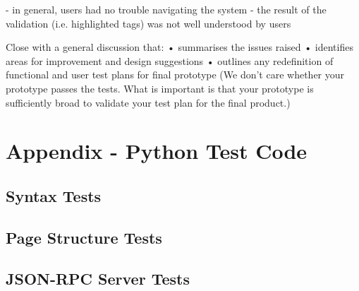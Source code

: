 \documentclass[10pt]{article}
\begin{document}
- in general, users had no trouble navigating the system
- the result of the validation (i.e. highlighted tags) was not well understood by users

Close with a general discussion that: 
• summarises the issues raised 
• identifies areas for improvement and design suggestions 
• outlines any redefinition of functional and user test plans for final 
prototype 
(We don’t care whether your prototype passes the tests. What is 
important is that your prototype is sufficiently broad to validate your test 
plan for the final product.)

\newpage

\section*{Appendix - Python Test Code}

\subsection*{Syntax Tests}



\newpage

\subsection*{Page Structure Tests}



\newpage

\subsection*{JSON-RPC Server Tests}


\end{document}
